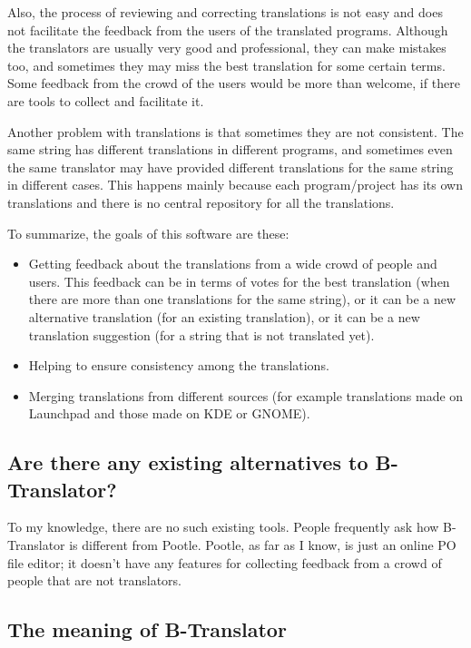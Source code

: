 \documentclass[11pt]{article}
\begin{document}
   Also, the process of reviewing and correcting translations is not
   easy and does not facilitate the feedback from the users of the
   translated programs. Although the translators are usually very good
   and professional, they can make mistakes too, and sometimes they
   may miss the best translation for some certain terms. Some feedback
   from the crowd of the users would be more than welcome, if there
   are tools to collect and facilitate it.

   Another problem with translations is that sometimes they are not
   consistent. The same string has different translations in different
   programs, and sometimes even the same translator may have provided
   different translations for the same string in different cases. This
   happens mainly because each program/project has its own
   translations and there is no central repository for all the
   translations.

   To summarize, the goals of this software are these:
\begin{itemize}
\item Getting feedback about the translations from a wide crowd of
     people and users. This feedback can be in terms of votes for the
     best translation (when there are more than one translations for
     the same string), or it can be a new alternative translation (for
     an existing translation), or it can be a new translation
     suggestion (for a string that is not translated yet).
\item Helping to ensure consistency among the translations.
\item Merging translations from different sources (for example
     translations made on Launchpad and those made on KDE or GNOME).
\end{itemize}
\subsection{Are there any existing alternatives to B-Translator?}
\label{sec-2.2}


   To my knowledge, there are no such existing tools.  People
   frequently ask how B-Translator is different from Pootle.  Pootle,
   as far as I know, is just an online PO file editor; it doesn't have
   any features for collecting feedback from a crowd of people that
   are not translators.

\subsection{The meaning of B-Translator}
\label{sec-2.3}
\end{document}
